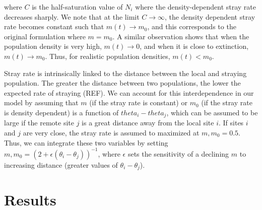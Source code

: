 \documentclass[onecolumn,preprintnumbers,amsmath,amssymb,superscriptaddress]{revtex4}
\begin{document}
\noindent where $C$ is the half-saturation value of $N_i$ where the density-dependent stray rate decreases sharply.
We note that at the limit $C\rightarrow \infty$, the density dependent stray rate becomes constant such that $m(t) \rightarrow m_0$, and this corresponds to the original formulation where $m=m_0$.
A similar observation shows that when the population density is very high, $m(t) \rightarrow 0$, and when it is close to extinction, $m(t) \rightarrow m_0$.
Thus, for realistic population densities, $m(t) < m_0$.


Stray rate is intrinsically linked to the distance between the local and straying population.
The greater the distance between two populations, the lower the expected rate of straying (REF).
We can account for this interdependence in our model by assuming that $m$ (if the stray rate is constant) or $m_0$ (if the stray rate is density dependent) is a function of $theta_i-theta_j$, which can be assumed to be large if the remote site $j$ is a great distance away from the local site $i$.
If sites $i$ and $j$ are very close, the stray rate is assumed to maximized at $m,m_0 = 0.5$.
Thus, we can integrate these two variables by setting $m,m_0 = (2 + \epsilon (\theta_i-\theta_j))^{-1}$, where $\epsilon$ sets the sensitivity of a declining $m$ to increasing distance (greater values of $\theta_i-\theta_j$).



\section*{Results}

\end{document}
